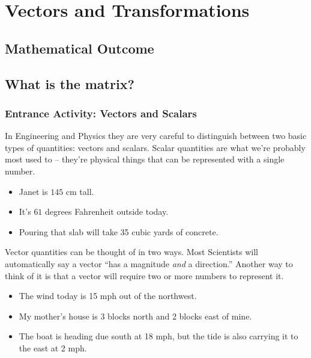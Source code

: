 \chapter{Vectors and Transformations}\label{vect_n_trans}

\setcounter{section}{-1}
\section{Mathematical Outcome}\label{sec:VectorOutcome}

\section{What is the matrix?}\label{sec:Matrix}

\newpage
\subsection{Entrance Activity: Vectors and Scalars}

In Engineering and Physics they are very careful to distinguish between two basic types of quantities: vectors and scalars.  Scalar quantities are what we're probably most used to -- they're physical things that can be represented with a single number.

\begin{itemize}
    \item Janet is $145$ cm tall.
    \item It's $61$ degrees Fahrenheit outside today.
    \item Pouring that slab will take 35 cubic yards of concrete.
\end{itemize}

Vector quantities can be thought of in two ways.  Most Scientists will automatically say a vector ``has a magnitude {\em and} a direction.''  Another way to think of it is that a vector will require two or more numbers to represent it.

\begin{itemize}
    \item The wind today is 15 mph out of the northwest.
    \item My mother's house is 3 blocks north and 2 blocks east of mine. 
    \item The boat is heading due south at 18 mph, but the tide is also carrying it to the east at 2 mph.
\end{itemize}

